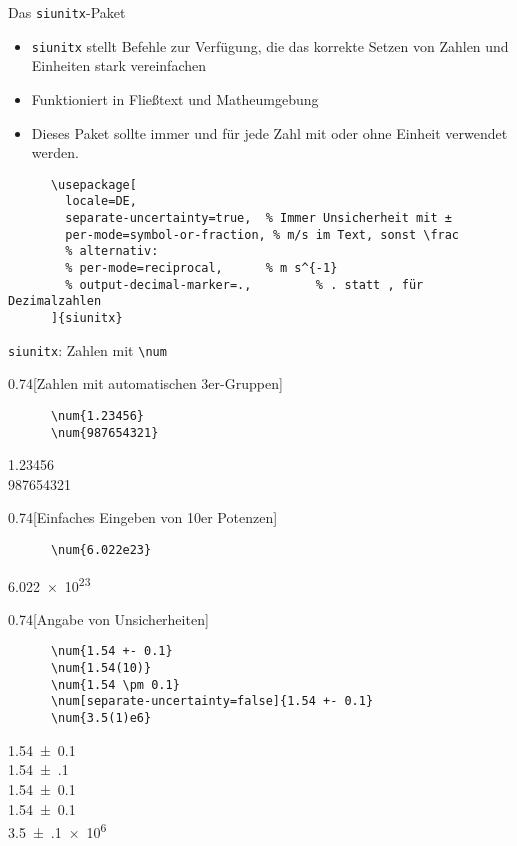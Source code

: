 \begin{frame}[fragile]{
  Das \texttt{siunitx}-Paket
  \hfill
}
\begin{itemize}
    \item \texttt{siunitx} stellt Befehle zur Verfügung, die das korrekte Setzen von Zahlen und Einheiten stark vereinfachen
    \item Funktioniert in Fließtext und Matheumgebung
    \item[$\color{vertexDarkRed}\Rightarrow$] Dieses Paket sollte \alert{immer} und für \alert{jede} Zahl mit oder ohne Einheit verwendet werden.
\end{itemize}
  \begin{Packages}
    \begin{verbatim}
      \usepackage[
        locale=DE,
        separate-uncertainty=true,  % Immer Unsicherheit mit ±
        per-mode=symbol-or-fraction, % m/s im Text, sonst \frac
        % alternativ:
        % per-mode=reciprocal,      % m s^{-1}
        % output-decimal-marker=.,         % . statt , für Dezimalzahlen
      ]{siunitx}
    \end{verbatim}
  \end{Packages}
\end{frame}

\begin{frame}[fragile]{\texttt{siunitx}: Zahlen mit \texttt{\backslash num}}
  \begin{CodeExample}{0.74}[Zahlen mit automatischen 3er-Gruppen]
    \begin{verbatim}
      \num{1.23456}
      \num{987654321}
    \end{verbatim}
  \CodeResult
    \strut
    \num{1.23456} \\
    \num{987654321}
  \end{CodeExample}
  \begin{CodeExample}{0.74}[Einfaches Eingeben von 10er Potenzen]
    \begin{verbatim}
      \num{6.022e23}
    \end{verbatim}
  \CodeResult
    \strut
    \num{6.022e23}
  \end{CodeExample}
  \begin{CodeExample}{0.74}[Angabe von Unsicherheiten]
    \begin{verbatim}
      \num{1.54 +- 0.1}
      \num{1.54(10)}
      \num{1.54 \pm 0.1}
      \num[separate-uncertainty=false]{1.54 +- 0.1}
      \num{3.5(1)e6}
    \end{verbatim}
  \CodeResult
    \strut
    \num{1.54 +- 0.1} \\
    \num{1.54(10)} \\
    \num{1.54 \pm 0.1} \\
    \num[separate-uncertainty=false]{1.54 +- 0.1} \\
    \num{3.5(1)e6}
  \end{CodeExample}
\end{frame}

